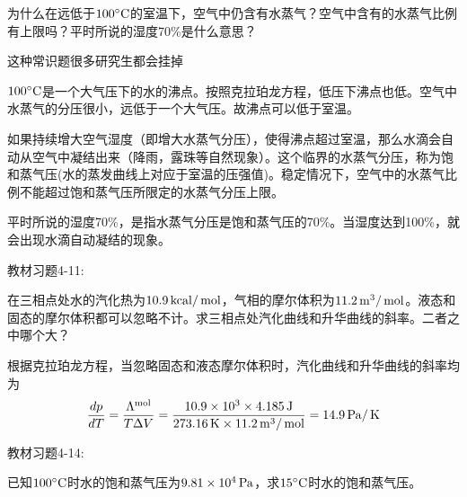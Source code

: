 \documentclass[CJK]{beamer}
\begin{document}
\begin{frame}
  \chtitle{\proid (\stwo)}
  \bch
  为什么在远低于$100^\circ \mathrm{C}$的室温下，空气中仍含有水蒸气？空气中含有的水蒸气比例有上限吗？平时所说的湿度70\%是什么意思？

  \skiplines

  \skiplines
  
  {\small 这种常识题很多研究生都会挂掉\huaixiao}
  
  \ech
\end{frame}


\begin{frame}
  \bch
  $100^\circ \mathrm{C}$是一个大气压下的水的沸点。按照克拉珀龙方程，低压下沸点也低。空气中水蒸气的分压很小，远低于一个大气压。故沸点可以低于室温。

  \skipline

  如果持续增大空气湿度（即增大水蒸气分压），使得沸点超过室温，那么水滴会自动从空气中凝结出来（降雨，露珠等自然现象）。这个临界的水蒸气分压，称为饱和蒸气压(水的蒸发曲线上对应于室温的压强值)。稳定情况下，空气中的水蒸气比例不能超过饱和蒸气压所限定的水蒸气分压上限。

  \skipline
  
  平时所说的湿度70\%，是指水蒸气分压是饱和蒸气压的70\%。当湿度达到100\%，就会出现水滴自动凝结的现象。
  \ech
\end{frame}


\begin{frame}
  \chtitle{\proid (\stwo)}
  \bch
  教材习题4-11:

  在三相点处水的汽化热为$10.9\,\mathrm{kcal}/\,\mathrm{mol}$，气相的摩尔体积为$11.2\,\mathrm{m}^3/\,\mathrm{mol}$。液态和固态的摩尔体积都可以忽略不计。求三相点处汽化曲线和升华曲线的斜率。二者之中哪个大？
  \ech
\end{frame}


\begin{frame}
  \bch
  根据克拉珀龙方程，当忽略固态和液态摩尔体积时，汽化曲线和升华曲线的斜率均为
  $$\frac{dp}{dT} = \frac{\Lambda^{\rm mol}}{T\Delta V} = \frac{10.9\times 10^3 \times 4.185 \,\mathrm{J}}{273.16\,\mathrm{K}\times 11.2\,\mathrm{m}^3/\,\mathrm{mol}} = 14.9 \,\mathrm{Pa}/\,\mathrm{K}$$
  \ech
\end{frame}


\begin{frame}
  \chtitle{\proid (\stwo)}
  \bch
  教材习题4-14:

  已知$100^\circ \mathrm{C}$时水的饱和蒸气压为$9.81\times 10^4 \,\mathrm{Pa}$，求$15^\circ \mathrm{C}$时水的饱和蒸气压。
  \ech
\end{frame}
\end{document}
